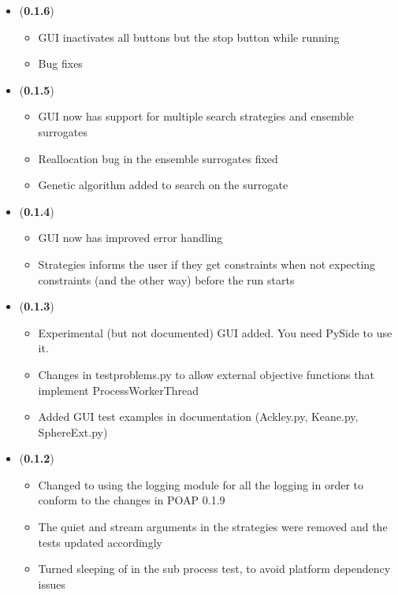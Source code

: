 \documentclass[]{article}
\begin{document}
\begin{itemize}
	\item (\textbf{0.1.6}) 
	\begin{itemize}
		\item GUI inactivates all buttons but the stop button while running
		\item Bug fixes
	\end{itemize}

	\item (\textbf{0.1.5}) 
	\begin{itemize}
		\item GUI now has support for multiple search strategies and ensemble surrogates
		\item Reallocation bug in the ensemble surrogates fixed
		\item Genetic algorithm added to search on the surrogate
	\end{itemize}

	\item (\textbf{0.1.4}) 
	\begin{itemize}
		\item GUI now has improved error handling 
		\item Strategies informs the user if they get constraints when not expecting constraints 
		(and the other way) before the run starts
	\end{itemize}

	\item (\textbf{0.1.3}) 
	\begin{itemize}
		\item Experimental (but not documented) GUI added. You need PySide to use it.
		\item Changes in testproblems.py to allow external objective functions that implement 
		ProcessWorkerThread
		\item Added GUI test examples in documentation (Ackley.py, Keane.py, SphereExt.py)
	\end{itemize}

	\item (\textbf{0.1.2})
	\begin{itemize}
		\item 	Changed to using the logging module for all the logging in order to conform to the 
		changes in POAP 0.1.9
		\item The quiet and stream arguments in the strategies were removed and the tests 
		updated accordingly
		\item Turned sleeping of in the sub process test, to avoid platform dependency issues
	\end{itemize}


\end{itemize}
\end{document}
